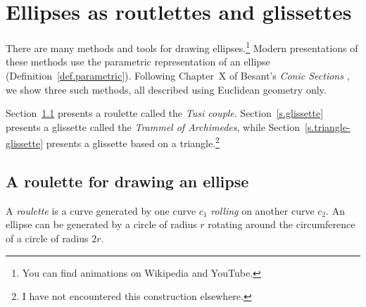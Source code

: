 
\chapter{Ellipses as routlettes and glissettes}\label{s.roulettes}

There are many methods and tools for drawing ellipses.\footnote{You can find animations on Wikipedia and YouTube.} Modern presentations of these methods use the parametric representation of an ellipse (Definition~\ref{def.parametric}). Following Chapter~X of Besant's \emph{Conic Sections} \cite{besant}, we show three such methods, all described using Euclidean geometry only. 

Section~\ref{s.roulette} presents a roulette called the \emph{Tusi couple}. Section~\ref{s.glissette} presents a glissette called the \emph{Trammel of Archimedes}, while Section~\ref{s.triangle-glissette} presents a glissette based on a triangle.\footnote{I have not encountered this construction elsewhere.}

\section{A roulette for drawing an ellipse}\label{s.roulette}

A \emph{roulette} is a curve generated by one curve $c_1$ \emph{rolling} on another curve $c_2$. An ellipse can be generated by a circle of radius $r$ rotating around the circumference of a circle of radius $2r$.


